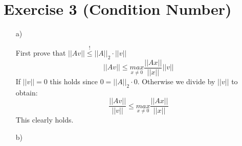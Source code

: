 \documentclass[10pt]{article}
\numberwithin{equation}{section}
\begin{document}
\section*{Exercise 3 (Condition Number)}
\begin{enumerate}
\item[a)]{
    First prove that $||Av|| \overset{!}{\leq}  ||A||_2 \cdot ||v||$ 
    $$||Av|| \leq \underset{x\neq 0}{max} \frac{||Ax||}{||x||} ||v||$$
    If $||v|| = 0$ this holds since $0 = ||A||_2 \cdot 0$. Otherwise we divide by $||v||$ to obtain:
    $$\frac{||Av||}{||v||} \leq \underset{x\neq 0}{max} \frac{||Ax||}{||x||}$$
    This clearly holds.
    


  }
\item[b)]{
  }
\end{enumerate}
\end{document}
